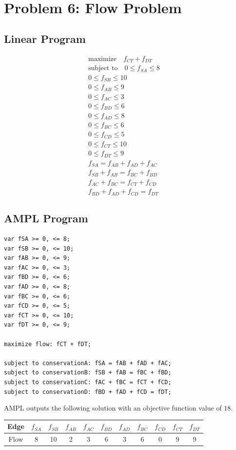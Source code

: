 \documentclass[12pt]{article}
\begin{document}
\newpage
\section*{Problem 6: Flow Problem}
\subsection*{Linear Program}
\begin{align*}
\text{maximize} \quad f_{CT} + f_{DT} & \\
\text{subject to} \quad  0 \leq f_{SA} \leq 8 \\
0 \leq f_{SB} \leq 10 \\
0 \leq f_{AB} \leq 9 \\
0 \leq f_{AC} \leq 3 \\
0 \leq f_{BD} \leq 6 \\
0 \leq f_{AD} \leq 8 \\
0 \leq f_{BC} \leq 6 \\
0 \leq f_{CD} \leq 5 \\
0 \leq f_{CT} \leq 10 \\
0 \leq f_{DT} \leq 9 \\
f_{SA}  = f_{AB} + f_{AD} + f_{AC} \\
f_{SB} + f_{AB} = f_{BC} + f_{BD} \\
f_{AC} + f_{BC} = f_{CT} + f_{CD} \\
f_{BD} + f_{AD} + f_{CD} = f_{DT}
\end{align*}

\subsection*{AMPL Program}
\begin{lstlisting}
var fSA >= 0, <= 8;
var fSB >= 0, <= 10;
var fAB >= 0, <= 9;
var fAC >= 0, <= 3;
var fBD >= 0, <= 6;
var fAD >= 0, <= 8;
var fBC >= 0, <= 6;
var fCD >= 0, <= 5;
var fCT >= 0, <= 10;
var fDT >= 0, <= 9;

maximize flow: fCT + fDT;

subject to conservationA: fSA = fAB + fAD + fAC;
subject to conservationB: fSB + fAB = fBC + fBD;
subject to conservationC: fAC + fBC = fCT + fCD;
subject to conservationD: fBD + fAD + fCD = fDT;
\end{lstlisting}

\begin{framed}
\noindent AMPL outputs the following solution with an objective function value of $18$.

\vspace{0.5cm}
\noindent \begin{tabular}{c|cccccccccc}
Edge & $f_{SA}$ & $f_{SB}$ & $f_{AB}$ & $f_{AC}$ & $f_{BD}$ & $f_{AD}$ & $f_{BC}$ & $f_{CD}$ & $f_{CT}$ & $f_{DT}$ \\
\hline
Flow & 8 & 10 & 2 & 3 & 6 & 3 & 6 & 0 & 9 & 9 
\end{tabular}
\end{framed}
\end{document}
